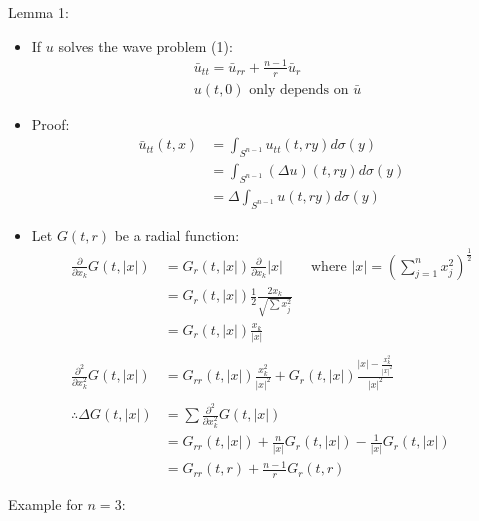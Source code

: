 \documentclass[12pt, a4paper]{article}
\begin{document}
Lemma 1:
\begin{itemize}
    \item If $u$ solves the wave problem (1):
    \begin{align*}
        &\bar{u}_{tt} = \bar{u}_{rr} + \frac{n-1}{r}\bar{u}_r\\
        &u(t, 0) \text{ only depends on } \bar{u}
    \end{align*}
    \item Proof:
    \begin{align*}
        \bar{u}_{tt}(t, x) &= \int_{S^{n-1}}u_{tt}(t, ry)d\sigma(y)\\
        &= \int_{S^{n-1}}(\Delta u)(t, ry)d\sigma(y)\\
        &=\Delta\int_{S^{n-1}}u(t, ry)d\sigma(y)
    \end{align*}
    \item Let $G(t, r)$ be a radial function:
    \begin{align*}
        \frac{\partial}{\partial x_k}G(t, |x|) &= G_r(t, |x|)\frac{\partial}{\partial x_k}|x|\qquad\text{where }|x| = \left(\sum_{j=1}^n x_j^2\right)^{\frac{1}{2}}\\
        &= G_r(t, |x|)\frac{1}{2}\frac{2x_k}{\sqrt{\sum x_j^2}}\\
        &= G_r(t, |x|)\frac{x_k}{|x|}\\\\
        \frac{\partial^2}{\partial x_k^2}G(t, |x|) &= G_{rr}(t, |x|)\frac{x_k^2}{|x|^2}+G_{r}(t, |x|)\frac{|x|-\frac{x_k^2}{|x|^2}}{|x|^2}\\\\
        \therefore \Delta G(t, |x|) &= \sum \frac{\partial^2}{\partial x_k^2}G(t, |x|) \\
        &=G_{rr}(t, |x|) + \frac{n}{|x|}G_r(t, |x|) - \frac{1}{|x|}G_r(t, |x|)\\
        &=G_{rr}(t, r) + \frac{n-1}{r}G_r(t, r)
    \end{align*}
\end{itemize}
Example for $n=3$:
\end{document}

